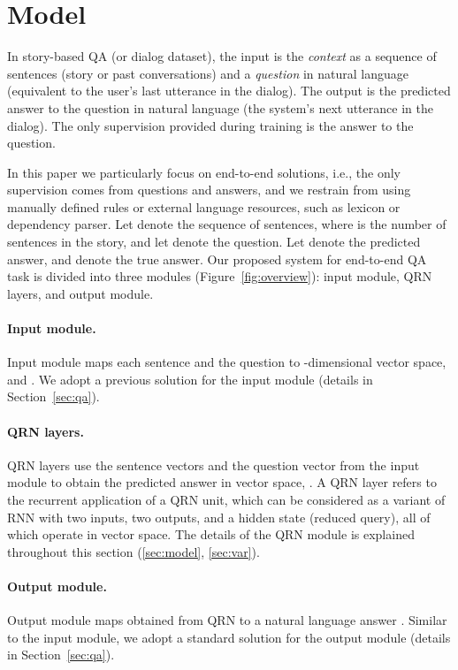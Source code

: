 \documentclass[table]{article}
\begin{document}
 
\section{Model}\label{sec:qrn}

In story-based QA (or dialog dataset), the input is the \emph{context} as a sequence of sentences (story or past conversations) and a \emph{question} in natural language (equivalent to the user's last utterance in the dialog). 
The output is the predicted answer to the question in natural language (the system's next utterance in the dialog).
The only supervision provided during training is the answer to the question. 





In this paper we particularly focus on end-to-end solutions, i.e.,  the only supervision comes from questions and answers, and we restrain from using manually defined rules or external language resources, such as lexicon or dependency parser. Let  denote the sequence of sentences,  where  is the number of sentences in the story, and let  denote the question. 
Let  denote the predicted answer, and  denote the true answer.
Our proposed system for end-to-end QA task is divided into three modules (Figure~\ref{fig:overview}): input module, QRN layers, and output module.

\paragraph{Input module.} 
Input module maps each sentence  and the question  to -dimensional vector space,  and .
We adopt a previous solution for the input module (details in Section~\ref{sec:qa}).

\paragraph{QRN layers.} 
QRN layers use the sentence vectors and the question vector from the input module to obtain the predicted answer in vector space, . 
A QRN layer refers to the recurrent application of a QRN unit, which can be considered as a variant of RNN with two inputs, two outputs, and a  hidden state (reduced query), all of which operate in vector space.
The details of the QRN module is explained throughout this section (\ref{sec:model}, \ref{sec:var}).

\paragraph{Output module.}
Output module maps  obtained from QRN to a natural language answer . 
Similar to the input module, we adopt a standard solution for the output module (details in Section~\ref{sec:qa}).
\end{document}

